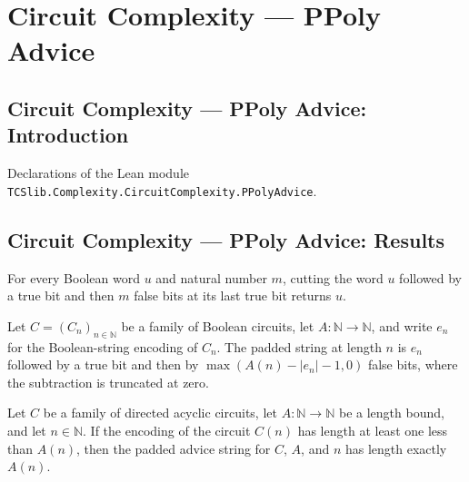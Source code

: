 \section{Circuit Complexity --- PPoly Advice}
\subsection*{Circuit Complexity --- PPoly Advice: Introduction}

Declarations of the Lean module \texttt{TCSlib.Complexity.CircuitComplexity.PPolyAdvice}.

\subsection*{Circuit Complexity --- PPoly Advice: Results}

\begin{lemma}
\label{Complexity.splitAtLastTrue_pad}
\leanok
{}
For every Boolean word $u$ and natural number $m$, cutting the word $u$ followed by a
true bit and then $m$ false bits at its last true bit returns $u$.
\end{lemma}

\begin{definition}
\label{Complexity.padAdvice}
\leanok
{}
Let $C=(C_n)_{n\in\mathbb{N}}$ be a family of Boolean circuits, let
$A:\mathbb{N}\to\mathbb{N}$, and write $e_n$ for the Boolean-string encoding of $C_n$.
The padded string at length $n$ is $e_n$ followed by a true bit and then by
$\max(A(n)-|e_n|-1,0)$ false bits, where the subtraction is truncated at zero.
\end{definition}

\begin{lemma}
\label{Complexity.length_padAdvice}
\leanok
{}
Let $C$ be a family of directed acyclic circuits, let $A:\mathbb{N}\to\mathbb{N}$ be a
length bound, and let $n\in\mathbb{N}$. If the encoding of the circuit $C(n)$ has length
at least one less than $A(n)$, then the padded advice string for $C$, $A$, and $n$ has
length exactly $A(n)$.
\end{lemma}

